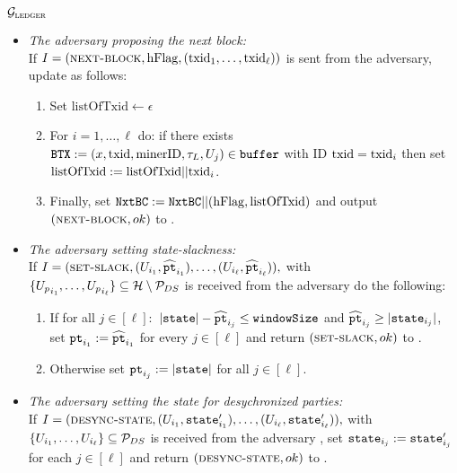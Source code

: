 \begin{systembox}{$\mathcal{G}_{\textsc{ledger}}$}
\begin{enumerate}
\begin{itemize}
			
			\item \emph{The adversary proposing the next block:} \\
			If $I=(\textsc{next-block}, \mathrm{hFlag}, (\text{txid}_1,\ldots,\text{txid}_\ell))$ is sent from the adversary, update \cbuffer as follows:%
			\begin{enumerate}\setlength\itemsep{1ex}
				\item Set $\mathrm{listOfTxid} \gets \epsilon$
				\item For $i=1,\ldots, \ell$ do: if there exists $\texttt{BTX}:=(x,\text{txid},\text{minerID},\tau_L,U_j)\in\texttt{buffer}$ with ID $\text{txid}=\text{txid}_i$ then set $\mathrm{listOfTxid}:=\mathrm{listOfTxid}||\text{txid}_i$.
				\item Finally, set $\texttt{NxtBC}:= \texttt{NxtBC} ||(\mathrm{hFlag},\mathrm{listOfTxid})$ and output $(\textsc{next-block}, ok)$ to \Adv.%
			\end{enumerate}
			
			\item \emph{The adversary setting state-slackness:}\\
			If $I=(\textsc{set-slack},(U_{i_1},\widehat{\texttt{pt}}_{i_1}),\ldots, (U_{i_\ell},\widehat{\texttt{pt}}_{i_\ell})),$ with $\{{U_p}_{i_1},\ldots,{U_p}_{i_\ell}\}\subseteq\mathcal{H}\setminus\mathcal{P}_{DS}$ is received from the adversary \Adv do the following:%
			\begin{enumerate}\setlength\itemsep{1ex}
				\item If for all $j\in[\ell]:$  $|\texttt{state}| -\widehat{\texttt{pt}}_{i_j}\leq\texttt{windowSize}$ and $\widehat{\texttt{pt}}_{i_j}\geq |\texttt{state}_{i_j}|$, set $\texttt{pt}_{i_1}:=\widehat{\texttt{pt}}_{i_1}$ for every $j\in[\ell]$ and return $(\textsc{set-slack},ok)$ to \Adv.
				\item Otherwise set $\texttt{pt}_{i_j}:=|\texttt{state}|$ for all $j\in[\ell]$.
			\end{enumerate}
			
			\item \emph{The adversary setting the state for desychronized parties:}\\
			If $I=(\textsc{desync-state},(U_{i_1},\texttt{state}_{i_1}'),\ldots, (U_{i_\ell},\texttt{state}_{i_\ell}')),$ with $\{U_{i_1},\ldots,U_{i_\ell}\}\subseteq\mathcal{P}_{DS}$ is received from the adversary \Adv, set $\texttt{state}_{i_j}:=\texttt{state}_{i_j}'$ for each $j\in[\ell]$ and return $(\textsc{desync-state},ok)$ to \Adv.
		\end{itemize}
		
	\end{enumerate}
	
\end{systembox}


